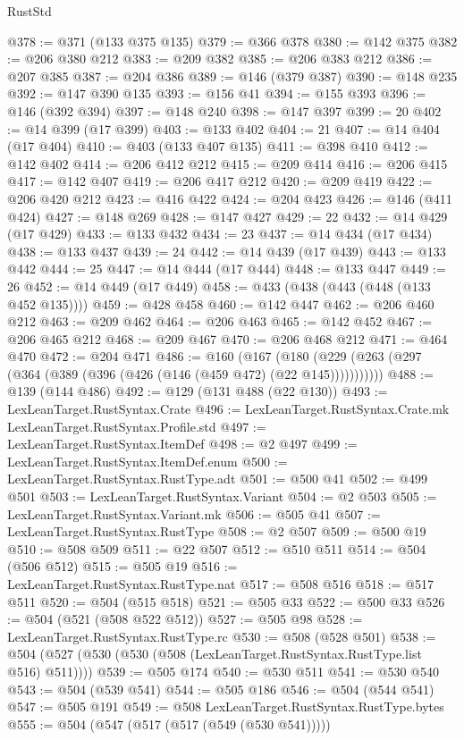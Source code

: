 \begin{lexlean}{RustStd}
\begin{coremodule}
@378 := @371 (@133 @375 @135)
@379 := @366 @378
@380 := @142 @375
@382 := @206 @380 @212
@383 := @209 @382
@385 := @206 @383 @212
@386 := @207 @385
@387 := @204 @386
@389 := @146 (@379 @387)
@390 := @148 @235
@392 := @147 @390 @135
@393 := @156 @41
@394 := @155 @393
@396 := @146 (@392 @394)
@397 := @148 @240
@398 := @147 @397
@399 := 20
@402 := @14 @399 (@17 @399)
@403 := @133 @402
@404 := 21
@407 := @14 @404 (@17 @404)
@410 := @403 (@133 @407 @135)
@411 := @398 @410
@412 := @142 @402
@414 := @206 @412 @212
@415 := @209 @414
@416 := @206 @415
@417 := @142 @407
@419 := @206 @417 @212
@420 := @209 @419
@422 := @206 @420 @212
@423 := @416 @422
@424 := @204 @423
@426 := @146 (@411 @424)
@427 := @148 @269
@428 := @147 @427
@429 := 22
@432 := @14 @429 (@17 @429)
@433 := @133 @432
@434 := 23
@437 := @14 @434 (@17 @434)
@438 := @133 @437
@439 := 24
@442 := @14 @439 (@17 @439)
@443 := @133 @442
@444 := 25
@447 := @14 @444 (@17 @444)
@448 := @133 @447
@449 := 26
@452 := @14 @449 (@17 @449)
@458 := @433 (@438 (@443 (@448 (@133 @452 @135))))
@459 := @428 @458
@460 := @142 @447
@462 := @206 @460 @212
@463 := @209 @462
@464 := @206 @463
@465 := @142 @452
@467 := @206 @465 @212
@468 := @209 @467
@470 := @206 @468 @212
@471 := @464 @470
@472 := @204 @471
@486 := @160
    (@167 (@180 (@229 (@263 (@297 (@364 (@389 (@396 (@426 (@146 (@459 @472) (@22 @145)))))))))))
@488 := @139 (@144 @486)
@492 := @129 (@131 @488 (@22 @130))
@493 := LexLeanTarget.RustSyntax.Crate
@496 := LexLeanTarget.RustSyntax.Crate.mk LexLeanTarget.RustSyntax.Profile.std
@497 := LexLeanTarget.RustSyntax.ItemDef
@498 := @2 @497
@499 := LexLeanTarget.RustSyntax.ItemDef.enum
@500 := LexLeanTarget.RustSyntax.RustType.adt
@501 := @500 @41
@502 := @499 @501
@503 := LexLeanTarget.RustSyntax.Variant
@504 := @2 @503
@505 := LexLeanTarget.RustSyntax.Variant.mk
@506 := @505 @41
@507 := LexLeanTarget.RustSyntax.RustType
@508 := @2 @507
@509 := @500 @19
@510 := @508 @509
@511 := @22 @507
@512 := @510 @511
@514 := @504 (@506 @512)
@515 := @505 @19
@516 := LexLeanTarget.RustSyntax.RustType.nat
@517 := @508 @516
@518 := @517 @511
@520 := @504 (@515 @518)
@521 := @505 @33
@522 := @500 @33
@526 := @504 (@521 (@508 @522 @512))
@527 := @505 @98
@528 := LexLeanTarget.RustSyntax.RustType.rc
@530 := @508 (@528 @501)
@538 := @504 (@527 (@530 (@530 (@508 (LexLeanTarget.RustSyntax.RustType.list @516) @511))))
@539 := @505 @174
@540 := @530 @511
@541 := @530 @540
@543 := @504 (@539 @541)
@544 := @505 @186
@546 := @504 (@544 @541)
@547 := @505 @191
@549 := @508 LexLeanTarget.RustSyntax.RustType.bytes
@555 := @504 (@547 (@517 (@517 (@549 (@530 @541)))))

\end{coremodule}
\end{lexlean}
